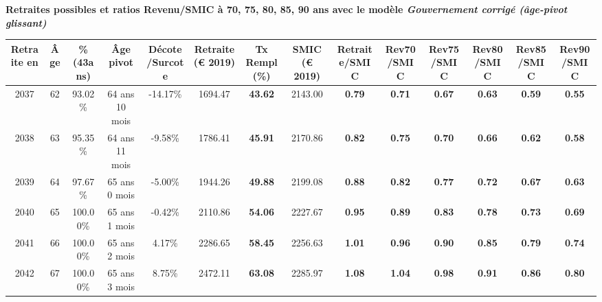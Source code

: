  \vspace{0.1cm} 
{\bf \noindent Retraites possibles et ratios Revenu/SMIC à 70, 75, 80, 85, 90 ans avec le modèle \emph{Gouvernement corrigé (âge-pivot glissant)}}  
 
\begin{adjustbox}{max width=\textwidth} 
\begin{tabular}[htb]{|c|c||c|c|c||c|c||c||c|c|c|c|c|c|} 
\hline 
 Retraite en &  Âge &  \%(43ans) &  Âge pivot &  Décote/Surcote &  Retraite (\euro{} 2019) &  Tx Rempl(\%) &  SMIC (\euro{} 2019) &  Retraite/SMIC &  Rev70/SMIC &  Rev75/SMIC &  Rev80/SMIC &  Rev85/SMIC &  Rev90/SMIC \\ 
\hline \hline 
 2037 &  62 &  93.02\% &  64 ans 10 mois &  -14.17\% &  1694.47 &  {\bf 43.62} &  2143.00 &  {\bf {\color{red} 0.79}} &  {\bf {\color{red} 0.71}} &  {\bf {\color{red} 0.67}} &  {\bf {\color{red} 0.63}} &  {\bf {\color{red} 0.59}} &  {\bf {\color{red} 0.55}} \\ 
\hline 
 2038 &  63 &  95.35\% &  64 ans 11 mois &  -9.58\% &  1786.41 &  {\bf 45.91} &  2170.86 &  {\bf {\color{red} 0.82}} &  {\bf {\color{red} 0.75}} &  {\bf {\color{red} 0.70}} &  {\bf {\color{red} 0.66}} &  {\bf {\color{red} 0.62}} &  {\bf {\color{red} 0.58}} \\ 
\hline 
 2039 &  64 &  97.67\% &  65 ans 0 mois &  -5.00\% &  1944.26 &  {\bf 49.88} &  2199.08 &  {\bf {\color{red} 0.88}} &  {\bf {\color{red} 0.82}} &  {\bf {\color{red} 0.77}} &  {\bf {\color{red} 0.72}} &  {\bf {\color{red} 0.67}} &  {\bf {\color{red} 0.63}} \\ 
\hline 
 2040 &  65 &  100.00\% &  65 ans 1 mois &  -0.42\% &  2110.86 &  {\bf 54.06} &  2227.67 &  {\bf {\color{red} 0.95}} &  {\bf {\color{red} 0.89}} &  {\bf {\color{red} 0.83}} &  {\bf {\color{red} 0.78}} &  {\bf {\color{red} 0.73}} &  {\bf {\color{red} 0.69}} \\ 
\hline 
 2041 &  66 &  100.00\% &  65 ans 2 mois &  4.17\% &  2286.65 &  {\bf 58.45} &  2256.63 &  {\bf 1.01} &  {\bf {\color{red} 0.96}} &  {\bf {\color{red} 0.90}} &  {\bf {\color{red} 0.85}} &  {\bf {\color{red} 0.79}} &  {\bf {\color{red} 0.74}} \\ 
\hline 
 2042 &  67 &  100.00\% &  65 ans 3 mois &  8.75\% &  2472.11 &  {\bf 63.08} &  2285.97 &  {\bf 1.08} &  {\bf 1.04} &  {\bf {\color{red} 0.98}} &  {\bf {\color{red} 0.91}} &  {\bf {\color{red} 0.86}} &  {\bf {\color{red} 0.80}} \\ 
\hline 
\hline 
\end{tabular} 
\end{adjustbox} 
 

